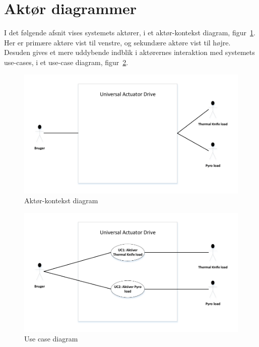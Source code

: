 \clearpage



\section{Aktør diagrammer}
I det følgende afsnit vises systemets aktører, i et aktør-kontekst diagram, figur~\ref{fig: Aktor_kontekst}. Her er primære aktøre vist til venstre, og sekundære aktøre vist til højre. Desuden gives et mere uddybende indblik i aktørernes interaktion med systemets use-cases, i et use-case diagram, figur~\ref{fig: use_case_diagram}.
\begin{figure}[H]
	\centering
	\includegraphics{tex/Kravspecifikation/billeder/AktorkontekstdiagramV1.pdf}
	\caption{Aktør-kontekst diagram}
	\label{fig: Aktor_kontekst}
\end{figure}

\begin{figure}[H]
	\centering
	\includegraphics{tex/Kravspecifikation/billeder/UseCasediagramV1.pdf}
	\caption{Use case diagram}
	\label{fig: use_case_diagram}
\end{figure}




